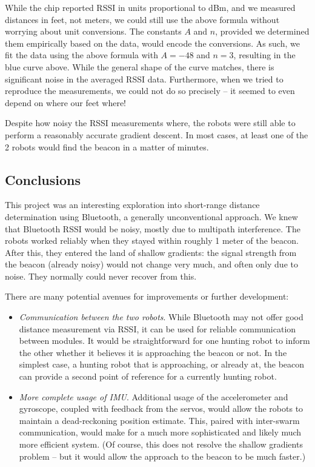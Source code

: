 \documentclass[]{article}
\providecommand{\tightlist}{%
  \setlength{\itemsep}{0pt}\setlength{\parskip}{0pt}}
\begin{document}
While the chip reported RSSI in units proportional to dBm, and we
measured distances in feet, not meters, we could still use the above
formula without worrying about unit conversions. The constants \(A\) and
\(n\), provided we determined them empirically based on the data, would
encode the conversions. As such, we fit the data using the above formula
with \(A=-48\) and \(n=3\), resulting in the blue curve above. While the
general shape of the curve matches, there is significant noise in the
averaged RSSI data. Furthermore, when we tried to reproduce the
measurements, we could not do so precisely -- it seemed to even depend
on where our feet where!

Despite how noisy the RSSI measurements where, the robots were still
able to perform a reasonably accurate gradient descent. In most cases,
at least one of the 2 robots would find the beacon in a matter of
minutes.

\subsection{Conclusions}

This project was an interesting exploration into short-range distance
determination using Bluetooth, a generally unconventional approach.
We knew that Bluetooth RSSI would be noisy, mostly due to multipath interference.
The robots worked reliably when they stayed within roughly 1 meter of the beacon.
After this, they entered the land of shallow gradients:
the signal strength from the beacon (already noisy) would not change very
much, and often only due to noise.
They normally could never recover from this.

There are many potential avenues for improvements or further
development:

\begin{itemize}
\tightlist
\item
  \emph{Communication between the two robots}. While Bluetooth may not
  offer good distance measurement via RSSI, it can be used for reliable
  communication between modules. It would be straightforward for one
  hunting robot to inform the other whether it believes it is
  approaching the beacon or not. In the simplest case, a hunting robot
  that is approaching, or already at, the beacon can provide a second
  point of reference for a currently hunting robot.
\item
  \emph{More complete usage of IMU}. Additional usage of the accelerometer and gyroscope, coupled with feedback from the servos, would allow the robots to maintain a dead-reckoning position estimate. This, paired with inter-swarm
  communication, would make for a much more sophisticated and likely
  much more efficient system. (Of course, this does not resolve the
  shallow gradients problem -- but it would allow the approach to the
  beacon to be much faster.)
\end{itemize}
\end{document}
